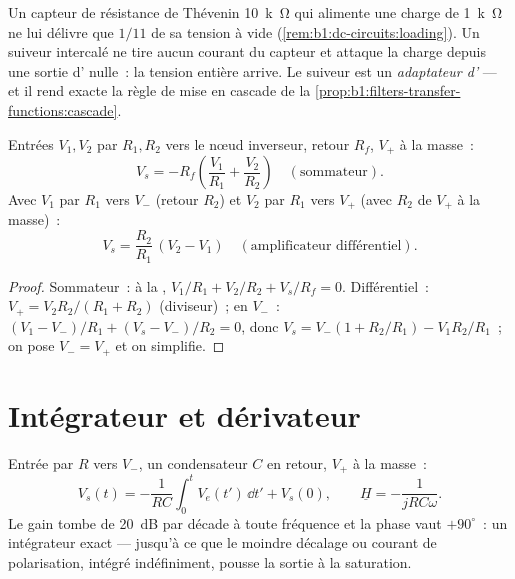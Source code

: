 \begin{example}\label{ex:b1:operational-amplifier:follower}
Un capteur de résistance de Thévenin \qty{10}{k\ohm} qui alimente une
charge de \qty{1}{k\ohm} ne lui délivre que $1/11$ de sa tension à vide
(\cref{rem:b1:dc-circuits:loading}). Un suiveur intercalé ne tire aucun
courant du capteur et attaque la charge depuis une sortie d'
nulle~: la tension entière arrive. Le suiveur est un
\emph{adaptateur d'} --- et il rend exacte la règle de mise en
cascade de la \cref{prop:b1:filters-transfer-functions:cascade}.
\end{example}

\begin{proposition}\label{prop:b1:operational-amplifier:sumdiff}
Entrées $V_1, V_2$ par $R_1, R_2$ vers le nœud inverseur, retour
$R_f$, $V_+$ à la masse~:
\[
V_s = -R_f\left(\frac{V_1}{R_1} + \frac{V_2}{R_2}\right)
\quad (\text{sommateur}).
\]
Avec $V_1$ par $R_1$ vers $V_-$ (retour $R_2$) et $V_2$ par
$R_1$ vers $V_+$ (avec $R_2$ de $V_+$ à la masse)~:
\[
V_s = \frac{R_2}{R_1}\,(V_2 - V_1)
\quad (\text{amplificateur différentiel}).
\]
\end{proposition}

\begin{proof}
Sommateur~:  à la , $V_1/R_1 + V_2/R_2 + V_s/R_f =
0$. Différentiel~: $V_+ = V_2R_2/(R_1 + R_2)$ (diviseur)~;  en $V_-$~:
$(V_1 - V_-)/R_1 + (V_s - V_-)/R_2 = 0$, donc $V_s = V_-(1 + R_2/R_1) -
V_1R_2/R_1$~; on pose $V_- = V_+$ et on simplifie.
\end{proof}

\section{Intégrateur et dérivateur}

\begin{proposition}[Intégrateur]\label{prop:b1:operational-amplifier:integrator}
Entrée par $R$ vers $V_-$, un condensateur $C$ en retour, $V_+$ à la
masse~:
\[
V_s(t) = -\frac{1}{RC}\int_0^t V_e(t')\,\dd t' + V_s(0),
\qquad
\underline H = -\frac{1}{jRC\omega} .
\]
Le gain tombe de \qty{20}{dB} par décade à toute fréquence et la phase
vaut $+90^\circ$~: un intégrateur exact --- jusqu'à ce que le moindre
décalage ou courant de polarisation, intégré indéfiniment, pousse la
sortie à la saturation.
\end{proposition}

